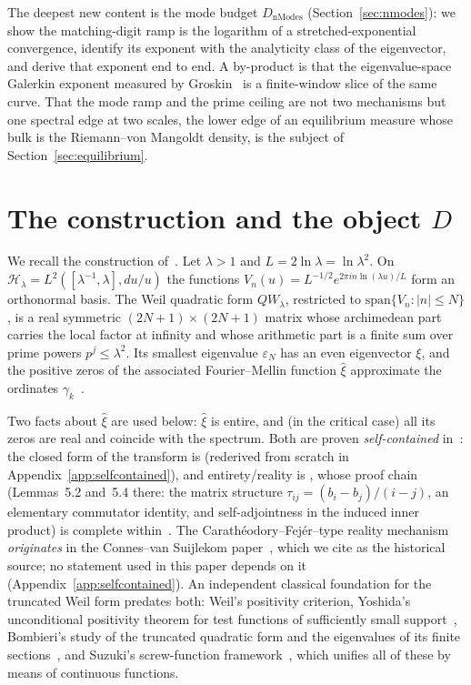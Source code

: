 \documentclass[11pt,a4paper]{article}
\begin{document}
The deepest new content is the mode budget $D_{\mathrm{nModes}}$
(Section~\ref{sec:nmodes}): we show the matching-digit ramp is the logarithm of
a stretched-exponential convergence, identify its exponent with the analyticity
class of the eigenvector, and derive that exponent end to end. A by-product is
that the eigenvalue-space Galerkin exponent measured by Groskin~\cite{Groskin2026}
is a finite-window slice of the same curve. That the mode ramp and the prime
ceiling are not two mechanisms but one spectral edge at two scales, the lower
edge of an equilibrium measure whose bulk is the Riemann--von Mangoldt density,
is the subject of Section~\ref{sec:equilibrium}.

\section{The construction and the object $D$}\label{sec:background}

We recall the construction of~\cite{CCM2025,CvS2025}. Let $\lambda>1$ and
$L=2\ln\lambda=\ln\lambda^2$. On $\mathcal H_\lambda=L^2([\lambda^{-1},\lambda],
du/u)$ the functions $V_n(u)=L^{-1/2}e^{2\pi i n\ln(\lambda u)/L}$ form an
orthonormal basis. The Weil quadratic form $QW_\lambda$, restricted to
$\mathrm{span}\{V_n:|n|\le N\}$, is a real symmetric $(2N{+}1)\times(2N{+}1)$
matrix whose archimedean part carries the local factor at infinity and whose
arithmetic part is a finite sum over prime powers $p^j\le\lambda^2$. Its
smallest eigenvalue $\varepsilon_N$ has an even eigenvector $\xi$, and the
positive zeros of the associated Fourier--Mellin function $\widehat\xi$
approximate the ordinates $\gamma_k$~\cite{CCM2025}.

Two facts about $\widehat\xi$ are used below: $\widehat\xi$ is entire, and (in
the critical case) all its zeros are real and coincide with the spectrum. Both
are proven \emph{self-contained} in~\cite{CCM2025}: the closed form of the
transform is \cite[Prop.~5.9]{CCM2025} (rederived from scratch in
Appendix~\ref{app:selfcontained}), and entirety/reality is
\cite[Thm.~5.10]{CCM2025}, whose proof chain (Lemmas~5.2 and~5.4 there: the
matrix structure $\tau_{ij}=(b_i-b_j)/(i-j)$, an elementary commutator
identity, and self-adjointness in the induced inner product) is complete
within~\cite{CCM2025}. The Carath\'eodory--Fej\'er--type reality mechanism
\emph{originates} in the Connes--van Suijlekom paper~\cite{CvS2025}, which we
cite as the historical source; no statement used in this paper depends on it
(Appendix~\ref{app:selfcontained}). An independent classical foundation for the
truncated Weil form predates both: Weil's positivity criterion, Yoshida's
unconditional positivity theorem for test functions of sufficiently small
support~\cite{Yoshida1992}, Bombieri's study of the truncated quadratic form
and the eigenvalues of its finite sections~\cite{Bombieri2000}, and Suzuki's
screw-function framework~\cite{SuzukiJLMS,SuzukiHilbert,Suzuki2026}, which
unifies all of these by means of continuous functions.
\end{document}
